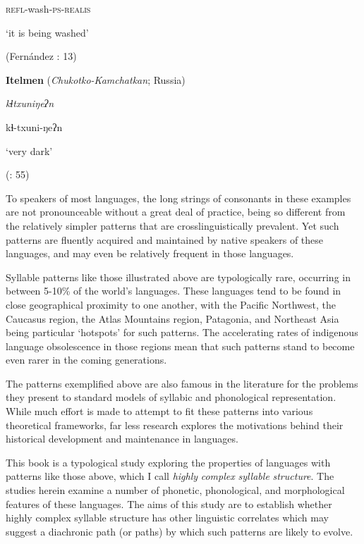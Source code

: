 \textsc{refl}-wash-\textsc{ps-realis}

‘it is being washed’

(Fernández \citealt{GarayHernández2006}: 13)

\z

\ea\label{ex:(1.5)}
   \textbf{Itelmen} (\textit{Chukotko-Kamchatkan}; Russia)

\textit{kɬtxuniŋeʔn}

kɬ-txuni-ŋeʔn

‘very dark’

(\citealt{GeorgVolodin1999}: 55)

\z

To speakers of most languages, the long strings of consonants in these examples are not pronounceable without a great deal of practice, being so different from the relatively simpler patterns that are crosslinguistically prevalent. Yet such patterns are fluently acquired and maintained by native speakers of these languages, and may even be relatively frequent in those languages.

  Syllable patterns like those illustrated above are typologically rare, occurring in between 5-10\% of the world’s languages. These languages tend to be found in close geographical proximity to one another, with the Pacific Northwest, the Caucasus region, the Atlas Mountains region, Patagonia, and Northeast Asia being particular ‘hotspots’ for such patterns. The accelerating rates of indigenous language obsolescence in those regions mean that such patterns stand to become even rarer in the coming generations.

  The patterns exemplified above are also famous in the literature for the problems they present to standard models of syllabic and phonological representation. While much effort is made to attempt to fit these patterns into various theoretical frameworks, far less research explores the motivations behind their historical development and maintenance in languages.

  This book is a typological study exploring the properties of languages with patterns like those above, which I call \textit{highly} \textit{complex} \textit{syllable} \textit{structure}. The studies herein examine a number of phonetic, phonological, and morphological features of these languages. The aims of this study are to establish whether highly complex syllable structure has other linguistic correlates which may suggest a diachronic path (or paths) by which such patterns are likely to evolve.

